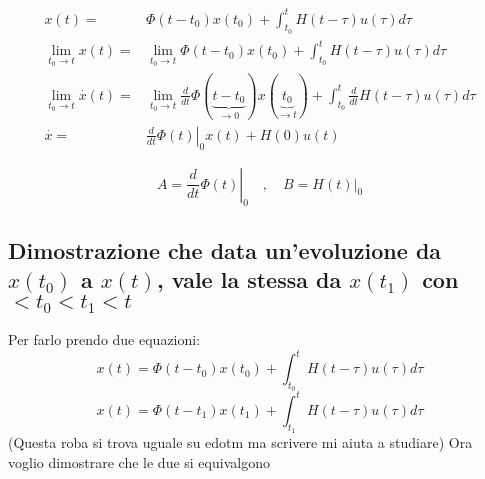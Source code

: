 \documentclass{article}
\begin{document}
\begin{align*}
    x(t)  = & \Phi(t-t_0)x(t_0)+\int_{t_0}^{t}H(t-\tau)u(\tau)d\tau \\
    \lim_{t_0\to t}x(t)  = & \lim_{t_0\to t} \Phi(t-t_0)x(t_0)+\int_{t_0}^{t}H(t-\tau)u(\tau)d\tau \\
    \lim_{t_0\to t}\overset{\cdot}{x}(t)  = &\lim_{t_0\to t} \frac{d}{dt}\Phi(\underbrace{t-t_0}_{\to 0})x(\underbrace{t_0}_{\to t})
        +\int_{t_0}^{t}\frac{d}{dt}H(t-\tau)u(\tau)d\tau\\
        \overset{\cdot}{x}  = & \left.\frac{d}{dt}\Phi(t)\right|_{0}x(t)+H(0)u(t)
\end{align*}

\[ A = \left.\frac{d}{dt}\Phi(t)\right|_{0} \quad,\quad B = \left.H(t)\right|_{0} \]



\subsection{\boldmath Dimostrazione che data un'evoluzione da $x(t_0)$ a $x(t)$, vale la stessa da $x(t_1)$ con $<t_0<t_1<t$}
Per farlo prendo due equazioni:
\begin{equation}
    x(t) = \Phi(t-t_0)x(t_0)+\int_{t_0}^{t} H(t-\tau)u(\tau)d\tau
\end{equation}
\begin{equation}
    x(t) = \Phi(t-t_1)x(t_1)+\int_{t_1}^{t} H(t-\tau)u(\tau)d\tau
\end{equation}
(Questa roba si trova uguale su edotm ma scrivere mi aiuta a studiare)
Ora voglio dimostrare che le due si equivalgono
\end{document}
